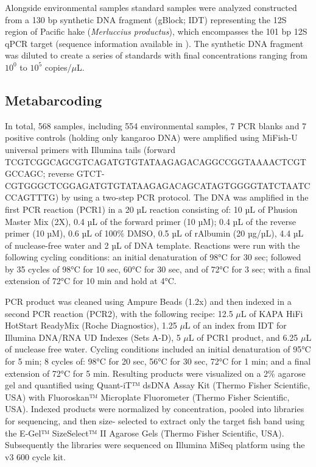 \documentclass{article}
\begin{document}
Alongside environmental samples standard samples were analyzed constructed from a 130 bp synthetic DNA fragment (gBlock; IDT) representing the 12S region of Pacific hake (\textit{Merluccius productus}), which encompasses the 101 bp 12S qPCR target (sequence information available in \cite{ramon-laca2021}). The synthetic DNA fragment was diluted to create a series of standards with final concentrations ranging from $10^{0}$ to $10^{5}$ copies/$\mu$L.

\subsection*{Metabarcoding}
In total, 568 samples, including 554 environmental samples, 7 PCR blanks and 7 positive controls (holding only kangaroo DNA) were amplified using MiFish-U universal primers \cite{miya2015} with Illumina tails (forward TCGTCGGCAGCGTCAGATGTGTATAAGAGACAGGCCGGTAAAACTCGTGCCAGC; reverse GTCT- CGTGGGCTCGGAGATGTGTATAAGAGACAGCATAGTGGGGTATCTAATCCCAGTTTG) by using a two-step PCR protocol. The DNA was amplified in the first PCR reaction (PCR1) in a 20 µL reaction consisting of: 10 µL of Phusion Master Mix (2X), 0.4 µL of the forward primer (10 µM); 0.4 µL of the reverse primer (10 µM), 0.6 µL of 100\% DMSO, 0.5 µL of rAlbumin (20 µg/µL), 4.4 µL of nuclease-free water and 2 µL of DNA template. Reactions were run with the following cycling conditions: an initial denaturation of 98°C for 30 sec; followed by 35 cycles of 98°C for 10 sec, 60°C for 30 sec, and of 72°C for 3 sec; with a final extension of 72°C for 10 min and hold at 4°C. 

PCR product was cleaned using Ampure Beads (1.2x) and then indexed in a second PCR reaction (PCR2), with the following recipe: 12.5 $\mu$L of KAPA HiFi HotStart ReadyMix (Roche Diagnostics), 1.25 $\mu$L of an index from IDT for Illumina DNA/RNA UD Indexes (Sets A-D), 5 $\mu$L of PCR1 product, and 6.25 $\mu$L of nuclease free water. Cycling conditions included an initial denaturation of 95°C for 5 min; 8 cycles of: 98°C for 20 sec, 56°C for 30 sec, 72°C for 1 min; and a final extension of 72°C for 5 min. Resulting products were visualized on a 2\% agarose gel and quantified using Quant-iT™ dsDNA Assay Kit (Thermo Fisher Scientific, USA) with Fluoroskan™ Microplate Fluorometer (Thermo Fisher Scientific, USA). Indexed products were normalized by concentration, pooled into libraries for sequencing, and then size- selected to extract only the target fish band using the E-Gel™ SizeSelect™ II Agarose Gels (Thermo Fisher Scientific, USA).  Subsequently the libraries were sequenced on Illumina MiSeq platform using the v3 600 cycle kit. 
\end{document}
